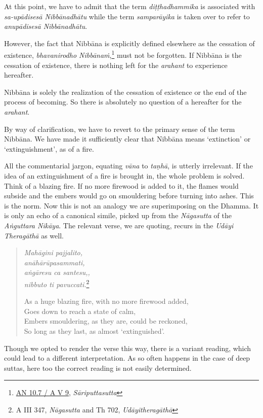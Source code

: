 At this point, we have to admit that the term \emph{diṭṭhadhammika} is associated with \emph{sa-upādisesā Nibbānadhātu} while the term \emph{samparāyika} is taken over to refer to \emph{anupādisesā Nibbānadhātu}.

However, the fact that Nibbāna is explicitly defined elsewhere as the cessation of existence, \emph{bhavanirodho Nibbānaṁ},\footnote{\href{https://suttacentral.net/an10.7/pli/ms}{AN 10.7 / A V 9}, \emph{Sāriputtasutta}} must not be forgotten. If Nibbāna is the cessation of existence, there is nothing left for the \emph{arahant} to experience hereafter.

Nibbāna is solely the realization of the cessation of existence or the end of the process of becoming. So there is absolutely no question of a hereafter for the \emph{arahant}.

By way of clarification, we have to revert to the primary sense of the term Nibbāna. We have made it sufficiently clear that Nibbāna means `extinction' or `extinguishment', as of a fire.

All the commentarial jargon, equating \emph{vāna} to \emph{taṇhā}, is utterly irrelevant. If the idea of an extinguishment of a fire is brought in, the whole problem is solved. Think of a blazing fire. If no more firewood is added to it, the flames would subside and the embers would go on smouldering before turning into ashes. This is the norm. Now this is not an analogy we are superimposing on the Dhamma. It is only an echo of a canonical simile, picked up from the \emph{Nāgasutta} of the \emph{Aṅguttara Nikāya}. The relevant verse, we are quoting, recurs in the \emph{Udāyi Theragāthā} as well.

\begin{quote}
\emph{Mahāgini pajjalito,}\\
\emph{anāhārūpasammati,}\\
\emph{aṅgāresu ca santesu,,}\\
\emph{nibbuto ti pavuccati.}\footnote{A III 347, \emph{Nāgasutta} and Th 702, \emph{Udāyitheragāthā}}

As a huge blazing fire, with no more firewood added,\\
Goes down to reach a state of calm,\\
Embers smouldering, as they are, could be reckoned,\\
So long as they last, as almost `extinguished'.
\end{quote}

Though we opted to render the verse this way, there is a variant reading, which could lead to a different interpretation. As so often happens in the case of deep suttas, here too the correct reading is not easily determined.

